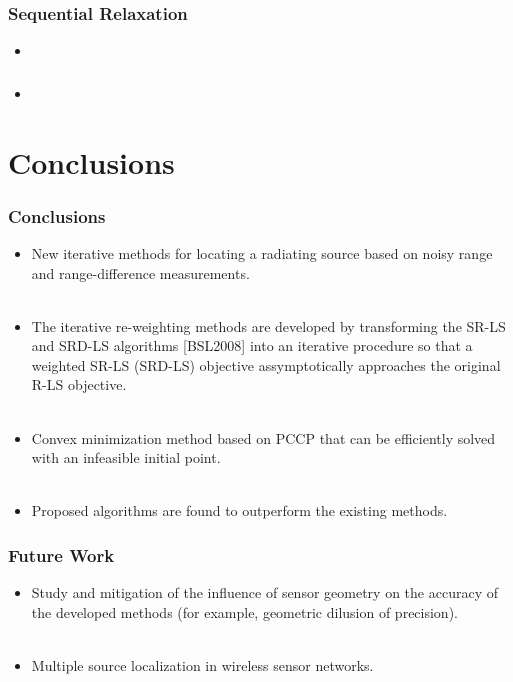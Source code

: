 \documentclass [t] {beamer} %
\begin{document}
\begin{frame} %
\frametitle{Sequential Relaxation}
\phantom{m}
\begin{itemize}
\item

\end{itemize}
\end{frame}

\begin{frame} %
\frametitle{}
\phantom{m}
\begin{itemize}
\item

\end{itemize}
\end{frame}
\section{Conclusions} 

\begin{frame}
\frametitle{Conclusions} 
\phantom{m}
\begin{itemize}
\item
New iterative methods for locating a radiating source based on noisy range and range-difference measurements.
\\~\\
\item
The iterative re-weighting methods are developed by transforming the SR-LS and SRD-LS algorithms [BSL2008] into an iterative procedure so that a weighted SR-LS (SRD-LS) objective assymptotically
approaches the original R-LS objective.
\\~\\
\item
Convex minimization method based on PCCP that can be efficiently solved with an infeasible initial point.
\\~\\
\item
Proposed algorithms are found to outperform the existing methods.
\end{itemize}
\end{frame}

\begin{frame} %
\frametitle{Future Work}
\phantom{m}
\phantom{m}
\phantom{m}
\begin{itemize}
\item
Study and mitigation of the influence of sensor geometry on the accuracy of the developed methods (for example, geometric dilusion of precision).
\\~\\
\item
Multiple source localization in wireless sensor networks.
\end{itemize}
\end{frame}
\end{document}
